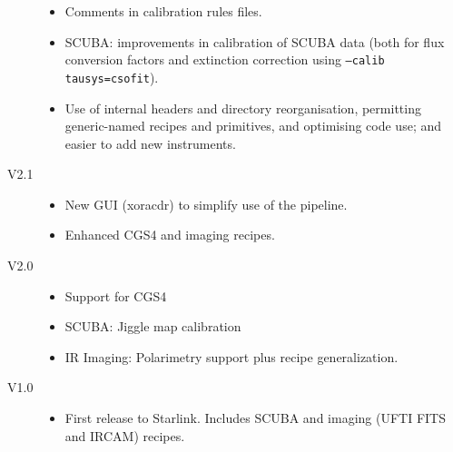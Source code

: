 \documentclass[twoside,11pt,nolof]{starlink}
\begin{document}
\begin{description}
\begin{itemize}
\item Comments in calibration rules files.

\item SCUBA: improvements in calibration of SCUBA data (both for flux
    conversion factors and extinction correction using
     \texttt{--calib tausys=csofit}).

\item Use of internal headers and directory reorganisation, permitting
     generic-named recipes and primitives, and optimising code use;
     and easier to add new instruments.

\end{itemize}

\item[V2.1]

\begin{itemize}

\item New GUI (xoracdr) to simplify use of the pipeline.

\item Enhanced CGS4 and imaging recipes.

\end{itemize}

\item[V2.0]

\begin{itemize}

\item Support for CGS4

\item SCUBA: Jiggle map calibration

\item IR Imaging: Polarimetry support plus recipe generalization.

\end{itemize}

\item[V1.0]

\begin{itemize}

\item First release to Starlink. Includes SCUBA and imaging (UFTI FITS
and IRCAM) recipes.

\end{itemize}

\end{description}


\appendix










\end{document}
